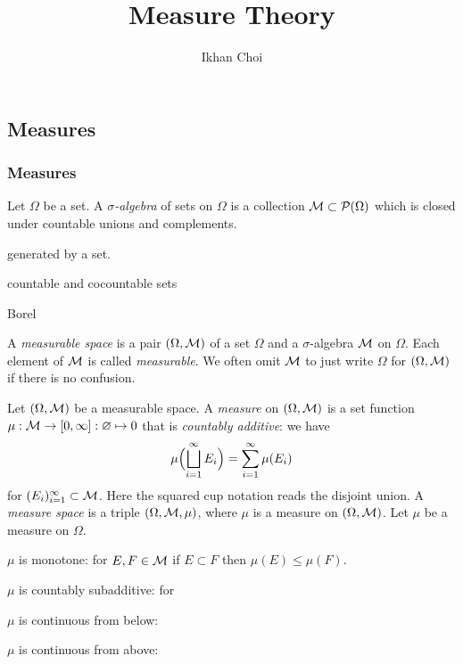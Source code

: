 \documentclass{../../large}
\begin{document}
\title{Measure Theory}
\author{Ikhan Choi}
\maketitle
\tableofcontents

\part{}





\chapter{Measures}


\section{Measures}

\begin{prb}
Let $\Omega$ be a set.
A \emph{$\sigma$-algebra} of sets on $\Omega$ is a collection $\mathcal{M}\subset\mathcal{P}(\Omega)$ which is closed under countable unions and complements.
\begin{parts}
\item generated by a set.
\item countable and cocountable sets
\item Borel
\end{parts}
\end{prb}

\begin{prb}[Measures]
A \emph{measurable space} is a pair $(\Omega,\mathcal{M})$ of a set $\Omega$ and a $\sigma$-algebra $\mathcal{M}$ on $\Omega$.
Each element of $\mathcal{M}$ is called \emph{measurable}.
We often omit $\mathcal{M}$ to just write $\Omega$ for $(\Omega,\mathcal{M})$ if there is no confusion.

Let $(\Omega,\mathcal{M})$ be a measurable space.
A \emph{measure} on $(\Omega,\mathcal{M})$ is a set function $\mu:\mathcal{M}\to[0,\infty]:\varnothing\mapsto0$ that is \emph{countably additive}: we have
\[\mu\Bigl(\bigsqcup_{i=1}^\infty E_i\Bigr)=\sum_{i=1}^\infty\mu(E_i)\]
for $(E_i)_{i=1}^\infty\subset\mathcal{M}$.
Here the squared cup notation reads the disjoint union.
A \emph{measure space} is a triple $(\Omega,\mathcal{M},\mu)$, where $\mu$ is a measure on $(\Omega,\mathcal{M})$.
Let $\mu$ be a measure on $\Omega$.
\begin{parts}
\item $\mu$ is monotone: for $E,F\in\mathcal{M}$ if $E\subset F$ then $\mu(E)\le\mu(F)$.
\item $\mu$ is countably subadditive: for
\item $\mu$ is continuous from below:
\item $\mu$ is continuous from above:
\end{parts}
\end{prb}
\end{document}
